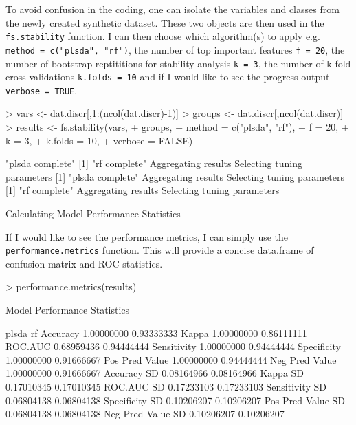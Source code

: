 \documentclass[12pt]{article}
\renewenvironment{Schunk}{\vspace{\topsep}}{\vspace{\topsep}}
\begin{document}
\begin{Schunk}
\end{Schunk}

To avoid confusion in the coding, one can isolate the variables and classes from the newly created synthetic dataset.  These two objects are then used in the {\tt fs.stability} function.  I can then choose which algorithm(s) to apply e.g. {\tt method = c("plsda", "rf")}, the number of top important features {\tt f = 20}, the number of bootstrap reptititions for stability analysis {\tt k = 3}, the number of k-fold cross-validations {\tt k.folds = 10} and if I would like to see the progress output {\tt verbose = TRUE}.

\begin{Schunk}
\begin{Sinput}
> vars <- dat.discr[,1:(ncol(dat.discr)-1)]
> groups <- dat.discr[,ncol(dat.discr)]
> results <- fs.stability(vars, 
+                         groups, 
+                         method = c("plsda", "rf"), 
+                         f = 20, 
+                         k = 3, 
+                         k.folds = 10, 
+                         verbose = FALSE)
\end{Sinput}
\begin{Soutput}
[1] "plsda complete"
[1] "rf complete"
Aggregating results
Selecting tuning parameters
[1] "plsda complete"
Aggregating results
Selecting tuning parameters
[1] "rf complete"
Aggregating results
Selecting tuning parameters

Calculating Model Performance Statistics
\end{Soutput}
\end{Schunk}

If I would like to see the performance metrics, I can simply use the {\tt performance.metrics} function.  This will provide a concise data.frame of confusion matrix and ROC statistics.

\begin{Schunk}
\begin{Sinput}
> performance.metrics(results)
\end{Sinput}
\begin{Soutput}
Model Performance Statistics

                       plsda         rf
Accuracy          1.00000000 0.93333333
Kappa             1.00000000 0.86111111
ROC.AUC           0.68959436 0.94444444
Sensitivity       1.00000000 0.94444444
Specificity       1.00000000 0.91666667
Pos Pred Value    1.00000000 0.94444444
Neg Pred Value    1.00000000 0.91666667
Accuracy SD       0.08164966 0.08164966
Kappa SD          0.17010345 0.17010345
ROC.AUC SD        0.17233103 0.17233103
Sensitivity SD    0.06804138 0.06804138
Specificity SD    0.10206207 0.10206207
Pos Pred Value SD 0.06804138 0.06804138
Neg Pred Value SD 0.10206207 0.10206207
\end{Soutput}
\end{Schunk}
\end{document}
